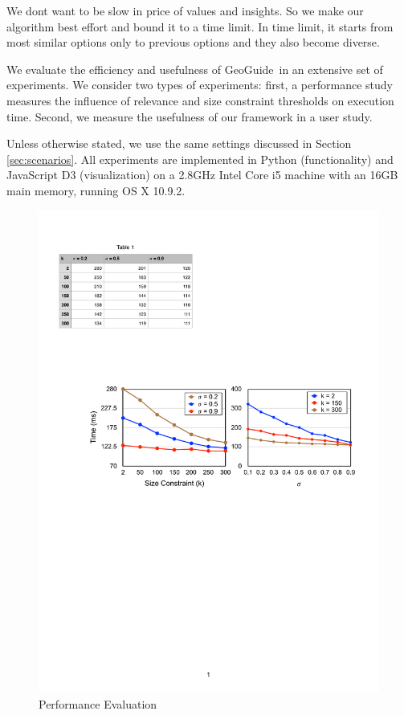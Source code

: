 \documentclass{vldb}
\newcommand{\framework}{{\sc GeoGuide}}
\begin{document}
We dont want to be slow in price of values and insights. So we make our algorithm best effort and bound it to a time limit. In time limit, it starts from most similar options only to previous options and they also become diverse.

We evaluate the efficiency and usefulness of \framework\ in an extensive set of experiments. We consider two types of experiments: first, a performance study measures the influence of relevance and size constraint thresholds on execution time. Second, we measure the usefulness of our framework in a user study.

\vspace{5pt}
 Unless otherwise stated, we use the same settings discussed in Section \ref{sec:scenarios}. All experiments are implemented in Python (functionality) and JavaScript D3 (visualization) on a 2.8GHz Intel Core i5 machine with an 16GB main memory, running OS X 10.9.2.

\begin{figure}
 \centering
 \includegraphics[width=\columnwidth]{figs/performance}
\caption{Performance Evaluation}
\vspace{-10pt}
\label{fig:performance}
\end{figure}
\end{document}
